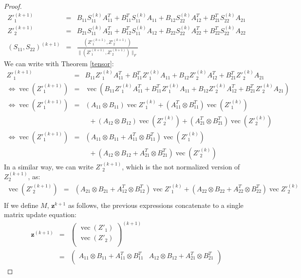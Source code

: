 \documentclass[a4paper,11pt]{report}
\newcommand{\vect}{\operatorname{vec}}
\begin{document}
\begin{proof}
\begin{eqnarray*}
  Z'^{(k+1)}_1 &=& B_{11}S^{(k)}_{11}A_{11}^T + B^T_{11}S^{(k)}_{11}A_{11} + B_{12}S^{(k)}_{22}A_{12}^T + B^T_{21}S^{(k)}_{22}A_{21}\\
  Z'^{(k+1)}_2 &=& B_{21}S^{(k)}_{11}A_{21}^T + B^T_{12}S^{(k)}_{11}A_{12} + B_{22}S^{(k)}_{22}A_{22}^T + B^T_{22}S^{(k)}_{22}A_{22} \\
 (S_{11}, S_{22})^{(k+1)} &=& \frac{(Z'^{(k+1)}_1, Z'^{(k+1)}_2)}{\|(Z'^{(k+1)}_1, Z'^{(k+1)}_2)\|_F}
 \end{eqnarray*}
We can write with Theorem \ref{tensor}:
\begin{eqnarray*}
  Z'^{(k+1)}_1 &=& B_{11}Z'^{(k)}_1A_{11}^T + B^T_{11}Z'^{(k)}_1A_{11} + B_{12}Z'^{(k)}_2A_{12}^T + B^T_{21}Z'^{(k)}_{2}A_{21}\\
 \Leftrightarrow \vect(Z'^{(k+1)}_1) &=& \vect(B_{11}Z'^{(k)}_1A_{11}^T + B^T_{11}Z'^{(k)}_1A_{11} + B_{12}Z'^{(k)}_2A_{12}^T + B^T_{21}Z'^{(k)}_{2}A_{21})\\
  \Leftrightarrow \vect(Z'^{(k+1)}_1) &=& (A_{11}\otimes B_{11})\vect{Z'^{(k)}_1}  
  + (A^T_{11}\otimes B^T_{11})\vect(Z'^{(k)}_1) \\
  && \;\; + (A_{12}\otimes B_{12})\vect(Z'^{(k)}_2)
  + (A^T_{21}\otimes B^T_{21})\vect(Z'^{(k)}_2) \\
  \Leftrightarrow \vect(Z'^{(k+1)}_1) &=& (A_{11}\otimes B_{11} + A^T_{11}\otimes B^T_{11})\vect(Z'^{(k)}_1)  \\ 
&&  \;\; + (A_{12}\otimes B_{12}+A^T_{21}\otimes B^T_{21})\vect(Z'^{(k)}_2)
 \end{eqnarray*}
 In a similar way, we can write $Z'^{(k+1)}_2$, which is the not normalized version of $Z^{(k+1)}_2$, as:
 \begin{eqnarray*}
 \vect(Z'^{(k+1)}_2) &=& (A_{21}\otimes B_{21} + A^T_{12}\otimes B^T_{12})\vect{Z'^{(k)}_1} + (A_{22}\otimes B_{22}+A^T_{22}\otimes B^T_{22})\vect{Z'^{(k)}_2}\\
\end{eqnarray*}
If we define $M$, $\mathbf{z}^{k+1}$ as follows, the previous expressions 
concatenate to a single matrix update equation:
\begin{eqnarray*}
\mathbf{z}^{(k+1)} &=& \begin{pmatrix}
\vect(Z'_1)\\
\vect(Z'_2)\\
\end{pmatrix}^{(k+1)}\\
&=& \begin{pmatrix}
A_{11}\otimes B_{11} + A^T_{11}\otimes B^T_{11}& A_{12}\otimes B_{12}+A^T_{21}\otimes B^T_{21}\\

\end{pmatrix}
\end{eqnarray*}
\end{proof}
\end{document}
